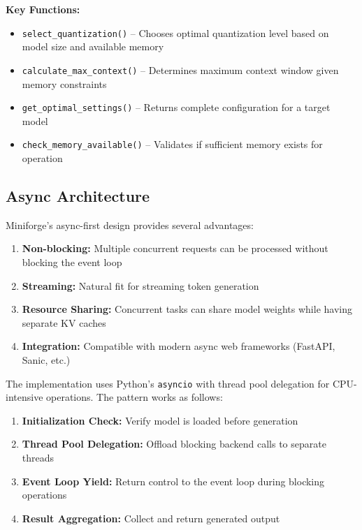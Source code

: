 \textbf{Key Functions:}
\begin{itemize}
    \item \texttt{select\_quantization()} -- Chooses optimal quantization level based on model size and available memory
    \item \texttt{calculate\_max\_context()} -- Determines maximum context window given memory constraints
    \item \texttt{get\_optimal\_settings()} -- Returns complete configuration for a target model
    \item \texttt{check\_memory\_available()} -- Validates if sufficient memory exists for operation
\end{itemize}

\subsection{Async Architecture}

Miniforge's async-first design provides several advantages:

\begin{enumerate}
    \item \textbf{Non-blocking:} Multiple concurrent requests can be processed without blocking the event loop
    \item \textbf{Streaming:} Natural fit for streaming token generation
    \item \textbf{Resource Sharing:} Concurrent tasks can share model weights while having separate KV caches
    \item \textbf{Integration:} Compatible with modern async web frameworks (FastAPI, Sanic, etc.)
\end{enumerate}

The implementation uses Python's \texttt{asyncio} with thread pool delegation for CPU-intensive operations. The pattern works as follows:

\begin{enumerate}
    \item \textbf{Initialization Check:} Verify model is loaded before generation
    \item \textbf{Thread Pool Delegation:} Offload blocking backend calls to separate threads
    \item \textbf{Event Loop Yield:} Return control to the event loop during blocking operations
    \item \textbf{Result Aggregation:} Collect and return generated output
\end{enumerate}

